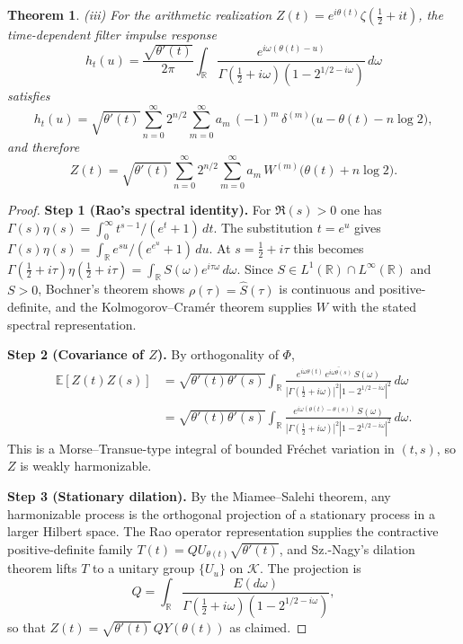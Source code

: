 \documentclass{amsart}
\newtheorem{theorem}{Theorem}
\begin{document}
\begin{theorem}
\noindent\textup{(iii)} For the arithmetic realization
$Z(t)=e^{i\theta(t)}\zeta(\frac{1}{2}+it)$, the time-dependent
filter impulse response
\[
  h_t(u)
  = \frac{\sqrt{\theta'(t)}}{2\pi}
    \int_{\mathbb{R}}
    \frac{e^{i\omega(\theta(t)-u)}}
         {\Gamma(\tfrac{1}{2}+i\omega)(1-2^{1/2-i\omega})}
    \,d\omega
\]
satisfies
\[
  h_t(u)
  = \sqrt{\theta'(t)}
    \sum_{n=0}^{\infty} 2^{n/2}
    \sum_{m=0}^{\infty} a_m\,
    (-1)^m\,\delta^{(m)}\!\bigl(u - \theta(t) - n\log 2\bigr),
\]
and therefore
\[
  \boxed{
  Z(t)
  = \sqrt{\theta'(t)}
    \sum_{n=0}^{\infty} 2^{n/2}
    \sum_{m=0}^{\infty} a_m\,
    W^{(m)}\!\bigl(\theta(t)+n\log 2\bigr).
  }
\]
\end{theorem}

\begin{proof}
\textbf{Step 1 (Rao's spectral identity).}
For $\Re(s)>0$ one has
$\Gamma(s)\eta(s)=\int_0^\infty t^{s-1}/(e^t+1)\,dt$.
The substitution $t=e^u$ gives
$\Gamma(s)\eta(s)=\int_{\mathbb{R}} e^{su}/(e^{e^u}+1)\,du$.
At $s=\tfrac{1}{2}+i\tau$ this becomes
$\Gamma(\tfrac{1}{2}+i\tau)\eta(\tfrac{1}{2}+i\tau)
=\int_{\mathbb{R}} S(\omega)e^{i\tau\omega}\,d\omega$.
Since $S\in L^1(\mathbb{R})\cap L^\infty(\mathbb{R})$ and $S>0$,
Bochner's theorem shows $\rho(\tau)=\hat{S}(\tau)$ is
continuous and positive-definite, and the Kolmogorov--Cram\'{e}r
theorem supplies $W$ with the stated spectral representation.

\textbf{Step 2 (Covariance of $Z$).}
By orthogonality of $\Phi$,
\begin{align*}
  \mathbb{E}[Z(t)Z(s)]
  &= \sqrt{\theta'(t)\theta'(s)}
     \int_{\mathbb{R}}
     \frac{e^{i\omega\theta(t)}\,\overline{e^{i\omega\theta(s)}}\,S(\omega)}
          {|\Gamma(\tfrac{1}{2}+i\omega)|^2|1-2^{1/2-i\omega}|^2}
     \,d\omega \\
  &= \sqrt{\theta'(t)\theta'(s)}
     \int_{\mathbb{R}}
     \frac{e^{i\omega(\theta(t)-\theta(s))}\,S(\omega)}
          {|\Gamma(\tfrac{1}{2}+i\omega)|^2|1-2^{1/2-i\omega}|^2}
     \,d\omega.
\end{align*}
This is a Morse--Transue-type integral of bounded Fr\'{e}chet
variation in $(t,s)$, so $Z$ is weakly harmonizable.

\textbf{Step 3 (Stationary dilation).}
By the Miamee--Salehi theorem, any harmonizable process is the
orthogonal projection of a stationary process in a larger Hilbert
space.  The Rao operator representation supplies the contractive
positive-definite family $T(t)=Q U_{\theta(t)}\sqrt{\theta'(t)}$,
and Sz.-Nagy's dilation theorem lifts $T$ to a unitary group
$\{U_u\}$ on $\mathcal{K}$.  The projection is
\[
  Q = \int_{\mathbb{R}}
      \frac{E(d\omega)}
           {\Gamma(\tfrac{1}{2}+i\omega)(1-2^{1/2-i\omega})},
\]
so that $Z(t)=\sqrt{\theta'(t)}\,QY(\theta(t))$ as claimed.


\end{proof}
\end{document}
